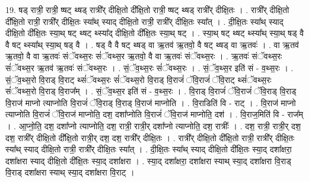 \documentclass[17pt]{extarticle}
\begin{document}
19. षड् रात्री॒ रात्री॒ ष्षट् थ्षड् रात्री᳚र् दीक्षि॒तो दी᳚क्षि॒तो रात्री॒ ष्षट् थ्षड् रात्री᳚र् दीक्षि॒तः । . रात्री᳚र् दीक्षि॒तो दी᳚क्षि॒तो रात्री॒ रात्री᳚र् दीक्षि॒तः स्या᳚थ् स्याद् दीक्षि॒तो रात्री॒ रात्री᳚र् दीक्षि॒तः स्या᳚त् । . दी॒क्षि॒तः स्या᳚थ् स्याद् दीक्षि॒तो दी᳚क्षि॒तः स्या॒थ् षट् थ्षट् थ्स्या᳚द् दीक्षि॒तो दी᳚क्षि॒तः स्या॒थ् षट् । . स्या॒थ् षट् थ्षट् थ्स्या᳚थ् स्या॒थ् षड् वै वै षट् थ्स्या᳚थ् स्या॒थ् षड् वै । . षड् वै वै षट् थ्षड् वा ऋ॒तव॑ ऋ॒तवो॒ वै षट् थ्षड् वा ऋ॒तवः॑ । . वा ऋ॒तव॑ ऋ॒तवो॒ वै वा ऋ॒तवः॑ संॅवथ्स॒रः सं॑ॅवथ्स॒र ऋ॒तवो॒ वै वा ऋ॒तवः॑ संॅवथ्स॒रः । . ऋ॒तवः॑ संॅवथ्स॒रः सं॑ॅवथ्स॒र ऋ॒तव॑ ऋ॒तवः॑ संॅवथ्स॒रः । . सं॒ॅव॒थ्स॒रः सं॑ॅवथ्स॒रः । . सं॒ॅव॒थ्स॒र इति॑ सं - व॒थ्स॒रः । . सं॒ॅव॒थ्स॒रो वि॒राड् वि॒राट् थ्सं॑ॅवथ्स॒रः सं॑ॅवथ्स॒रो वि॒राड् वि॒राजं॑ ॅवि॒राजं॑ ॅवि॒राट् 
थ्सं॑ॅवथ्स॒रः सं॑ॅवथ्स॒रो वि॒राड् वि॒राज᳚म् । . सं॒ॅव॒थ्स॒र इति॑ सं - व॒थ्स॒रः । . वि॒राड् वि॒राजं॑ ॅवि॒राजं॑ ॅवि॒राड् वि॒राड् वि॒राज॑ माप्नो त्याप्नोति वि॒राजं॑ ॅवि॒राड् वि॒राड् वि॒राज॑ माप्नोति । . वि॒राडिति॑ वि - राट् । . वि॒राज॑ माप्नो त्याप्नोति वि॒राजं॑ ॅवि॒राज॑ माप्नोति॒ दश॒ दशा᳚प्नोति वि॒राजं॑ ॅवि॒राज॑ माप्नोति॒ दश॑ । . वि॒राज॒मिति॑ वि - राज᳚म् । . आ॒प्नो॒ति॒ दश॒ दशा᳚प्नो त्याप्नोति॒ दश॒ रात्री॒ रात्री॒र् दशा᳚प्नो त्याप्नोति॒ दश॒ रात्रीः᳚ । . दश॒ रात्री॒ रात्री॒र् दश॒ दश॒ रात्री᳚र् दीक्षि॒तो दी᳚क्षि॒तो रात्री॒र् दश॒ दश॒ रात्री᳚र् दीक्षि॒तः । . रात्री᳚र् दीक्षि॒तो दी᳚क्षि॒तो रात्री॒ रात्री᳚र् दीक्षि॒तः स्या᳚थ् स्याद् दीक्षि॒तो रात्री॒ रात्री᳚र् दीक्षि॒तः स्या᳚त् । . दी॒क्षि॒तः स्या᳚थ् स्याद् दीक्षि॒तो दी᳚क्षि॒तः स्या॒द् दशा᳚क्षरा॒ दशा᳚क्षरा स्याद् दीक्षि॒तो दी᳚क्षि॒तः स्या॒द् दशा᳚क्षरा । . स्या॒द् दशा᳚क्षरा॒ दशा᳚क्षरा स्याथ् स्या॒द् दशा᳚क्षरा वि॒राड् वि॒राड् दशा᳚क्षरा स्याथ् स्या॒द् दशा᳚क्षरा वि॒राट् । \newline
\end{document}
